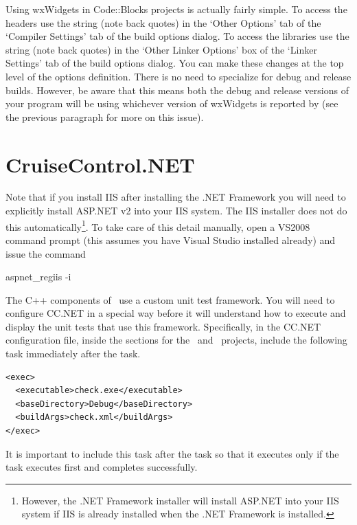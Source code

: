Using wxWidgets in Code::Blocks projects is actually fairly simple. To access the headers use the string  (note back quotes) in the `Other Options' tab of the `Compiler Settings' tab of the build options dialog. To access the libraries use the string  (note back quotes) in the `Other Linker Options' box of the `Linker Settings' tab of the build options dialog. You can make these changes at the top level of the options definition. There is no need to specialize for debug and release builds. However, be aware that this means both the debug and release versions of your program will be using whichever version of wxWidgets is reported by  (see the previous paragraph for more on this issue).

\section{CruiseControl.NET}

Note that if you install IIS after installing the .NET Framework you will need to explicitly install ASP.NET v2 into your IIS system. The IIS installer does not do this automatically\footnote{However, the .NET Framework installer will install ASP.NET into your IIS system if IIS is already installed when the .NET Framework is installed.}. To take care of this detail manually, open a VS2008 command prompt (this assumes you have Visual Studio installed already) and issue the command

\begin{commands}
aspnet\_regiis -i
\end{commands}

The C++ components of \VTank\ use a custom unit test framework. You will need to configure CC.NET in a special way before it will understand how to execute and display the unit tests that use this framework. Specifically, in the CC.NET configuration file, inside the sections for the \GameServer\ and \MapEditor\ projects, include the following  task immediately after the  task.
\begin{verbatim}
<exec>
  <executable>check.exe</executable>
  <baseDirectory>Debug</baseDirectory>
  <buildArgs>check.xml</buildArgs>
</exec>
\end{verbatim}

It is important to include this task after the  task so that it executes only if the  task executes first and completes successfully.

